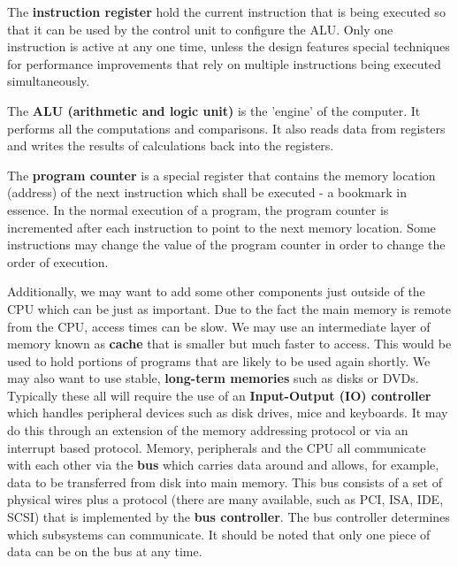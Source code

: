 \documentclass{article}
\begin{document}
	\par 
	The \textbf{instruction register} hold the current instruction that is being executed so that it can be used by the control unit to configure the ALU. Only one instruction is active at any one time, unless the design features special techniques for performance improvements that rely on multiple instructions being executed simultaneously.
	
	\par 
	The \textbf{ALU (arithmetic and logic unit)} is the 'engine' of the computer. It performs all the computations and comparisons. It also reads data from registers and writes the results of calculations back into the registers.
	
	\par 
	The \textbf{program counter} is a special register that contains the memory location (address) of the next instruction which shall be executed - a bookmark in essence. In the normal execution of a program, the program counter is incremented after each instruction to point to the next memory location. Some instructions may change the value of the program counter in order to change the order of execution.
	
	\par 
	Additionally, we may want to add some other components just outside of the CPU which can be just as important. Due to the fact the main memory is remote from the CPU, access times can be slow. We may use an intermediate layer of memory known as \textbf{cache} that is smaller but much faster to access. This would be used to hold portions of programs that are likely to be used again shortly. We may also want to use stable, \textbf{long-term memories} such as disks or DVDs. Typically these all will require the use of an \textbf{Input-Output (IO) controller} which handles peripheral devices such as disk drives, mice and keyboards. It may do this through an extension of the memory addressing protocol or via an interrupt based protocol. Memory, peripherals and the CPU all communicate with each other via the \textbf{bus} which carries data around and allows, for example, data to be transferred from disk into main memory. This bus consists of a set of physical wires plus a protocol (there are many available, such as PCI, ISA, IDE, SCSI) that is implemented by the \textbf{bus controller}. The bus controller determines which subsystems can communicate. It should be noted that only one piece of data can be on the bus at any time.
	
\end{document}
